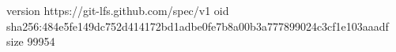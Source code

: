 version https://git-lfs.github.com/spec/v1
oid sha256:484e5fe149dc752d414172bd1adbe0fe7b8a00b3a777899024c3cf1e103aaadf
size 99954
